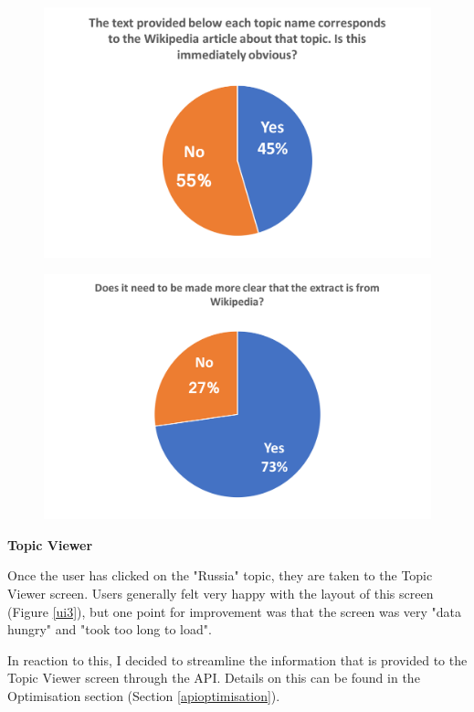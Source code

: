 \documentclass[12pt]{article}
\begin{document}
\begin{figure}[ht!]
  \centering
    \includegraphics[scale=0.6]{ui1.png}
   \caption[A graph depicting responses to the User Interface Survey]{}
   \label{ui1}
\end{figure} 

\begin{figure}[ht!]
  \centering
    \includegraphics[scale=0.6]{ui2.png}
   \caption[A graph depicting responses to the User Interface Survey]{}
   \label{ui2}
\end{figure} 

\textbf{Topic Viewer}

Once the user has clicked on the "Russia" topic, they are taken to the Topic Viewer screen. Users generally felt very happy with the layout of this screen (Figure \ref{ui3}), but one point for improvement was that the screen was very "data hungry" and "took too long to load".

In reaction to this, I decided to streamline the information that is provided to the Topic Viewer screen through the API. Details on this can be found in the Optimisation section (Section \ref{apioptimisation}). \\
\end{document}
